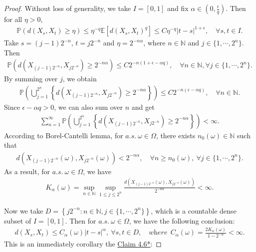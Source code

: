 \documentclass{article}
\numberwithin{equation}{section}
\newcommand{\E}{\mathbb{E}}
\renewcommand{\P}{\mathbb{P}}
\theoremstyle{plain}
\theoremstyle{definition}
\begin{document}
\begin{proof}
Without loss of generality, we take $I=[0,1]$ and fix $\alpha\in(0,\frac{\epsilon}{q})$. Then for all $\eta>0$,
\begin{align*}
	\P\left(d(X_s,X_t)\geq\eta\right)\leq\eta^{-q}\E\left[d(X_s,X_t)^q\right]\leq C\eta^{-q}\vert t-s\vert^{1+\epsilon},\quad\forall s,t\in I.
\end{align*}
Take $s=(j-1)2^{-n}$, $t=j2^{-n}$ and $\eta=2^{-n\alpha}$, where $n\in\mathbb{N}$ and $j\in\{1,\cdots,2^n\}$. Then
\begin{align*}
	\P\left(d(X_{(j-1)2^{-n}},X_{j2^{-n}})\geq2^{-n\alpha}\right)\leq C2^{-n(1+\epsilon-\alpha q)},\quad \forall n\in\mathbb{N},\forall j\in\{1,\cdots,2^n\}.
\end{align*}
By summing over $j$, we obtain
\begin{align*}
	\P\left(\bigcup_{j=1}^{2^n}\left\{d(X_{(j-1)2^{-n}},X_{j2^{-n}})\geq2^{-n\alpha}\right\}\right)\leq C2^{-n(\epsilon-\alpha q)},\quad \forall n\in\mathbb{N}.
\end{align*}
Since $\epsilon-\alpha q>0$, we can also sum over $n$ and get
\begin{align*}
	\sum_{n=1}^\infty\P\left(\bigcup_{j=1}^{2^n}\left\{d(X_{(j-1)2^{-n}},X_{j2^{-n}})\geq2^{-n\alpha}\right\}\right)<\infty.
\end{align*}
According to Borel-Cantelli lemma, for $a.s.\ \omega\in\Omega$, there exists $n_0(\omega)\in\mathbb{N}$ such that
\begin{align*}
	d\left(X_{(j-1)2^{-n}}(\omega),X_{j2^{-n}}(\omega)\right)< 2^{-n\alpha},\quad \forall n\geq n_0(\omega),\ \forall j\in\{1,\cdots,2^n\}.
\end{align*}
As a result, for $a.s.\ \omega\in\Omega$, we have
\begin{align*}
	K_\alpha(\omega) = \sup_{n\in\mathbb{N}}\sup_{1\leq j\leq 2^n}\frac{d\left(X_{(j-1)2^{-n}}(\omega),X_{j2^{-n}}(\omega)\right)}{2^{-n\alpha}}<\infty.
\end{align*}

Now we take $D=\left\{j2^{-n}:n\in\mathbb{N},j\in\{1,\cdots,2^n\}\right\}$, which is a countable dense subset of $I=[0,1]$. Then for $a.s.\ \omega\in\Omega$, we have the following conclusion:
\begin{align*}
	d(X_s,X_t)\leq C_\alpha(\omega)\vert t-s\vert^\alpha,\ \forall s,t\in D,\quad\textit{where}\ \ C_\alpha(\omega)=\frac{2K_\alpha(\omega)}{1-2^{-\alpha}}<\infty.
\end{align*}
This is an immediately corollary the \hyperref[claim:4.6*]{Claim 4.6*}:

\end{proof}
\end{document}
